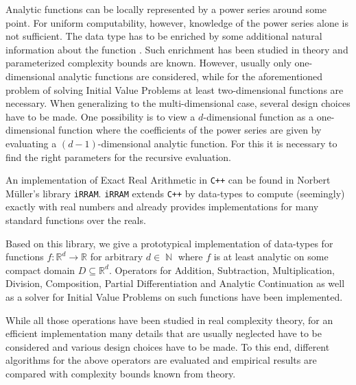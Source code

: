 \documentclass{article}
\newcommand{\RR}{\mathbb R}
\DeclareMathOperator{\NN}{\mathbb N}
\newcommand{\cc}{\texttt{C++}\xspace}
\newcommand{\irram}{\texttt{iRRAM}\xspace}
\begin{document}
Analytic functions can be locally represented by a power series around some point.
For uniform computability, however, knowledge of the power series alone is not sufficient.
The data type has to be enriched by some additional natural information about the function \cite{Mueller95}.
Such enrichment has been studied in theory and parameterized complexity bounds are known.
However, usually only one-dimensional analytic functions are considered, while for the aforementioned problem of solving Initial Value Problems at least two-dimensional functions are necessary.
When generalizing to the multi-dimensional case, several design choices have to be made.
One possibility is to view a $d$-dimensional function as a one-dimensional function where the coefficients of the power series are given by evaluating a $(d-1)$-dimensional analytic function.
For this it is necessary to find the right parameters for the recursive evaluation.

An implementation of Exact Real Arithmetic in \cc can be found in Norbert Müller's library \irram \cite{Mueller00}.
\irram extends \cc by data-types to compute (seemingly) exactly with real numbers and already provides implementations for many standard functions over the reals.

Based on this library, we give a prototypical implementation of data-types for functions $f: \RR^d \to \RR$ for arbitrary $d \in \NN$ where $f$ is at least analytic on some compact domain $D \subseteq \RR^d$.
Operators for Addition, Subtraction, Multiplication, Division, Composition, Partial Differentiation and Analytic Continuation as well as a solver for Initial Value Problems on such functions have been implemented.

While all those operations have been studied in real complexity theory, for an efficient implementation many details that are usually neglected have to be considered and various design choices have to be made.
To this end, different algorithms for the above operators are evaluated and empirical results are compared with complexity bounds known from theory. 


{}
\end{document}
